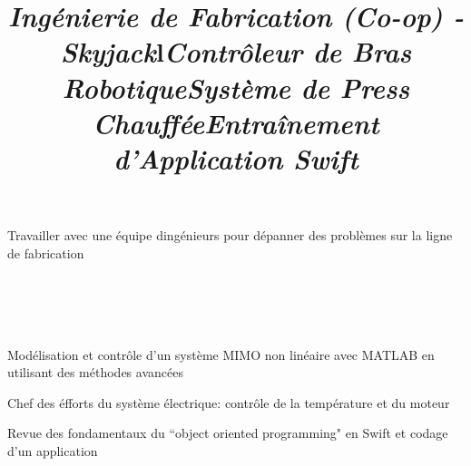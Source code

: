 \documentclass[mm]{res}
\begin{document}
\begin{resume}
\title{\textsl{Ing\'enierie de Fabrication (Co-op) - Skyjack}}
\begin{position}
\tb Travailler avec une \'equipe d\textquotesingle ing\'enieurs pour d\'epanner des probl\`emes sur la ligne de fabrication
\end{position}


\toprule

\section{\headingprojects}
\begin{format}
\title{l}\\
\body\\
\end{format}


\title{\textsl{Contr\^oleur de Bras Robotique}}
\begin{position}
\tb Mod\'elisation et contr\^ole d'un syst\`eme MIMO non lin\'eaire avec MATLAB en utilisant des m\'ethodes avanc\'ees
\end{position}

\title{\textsl{Syst\`eme de Press Chauff\'ee}}
\begin{position}
\tb Chef des \'efforts du syst\`eme \'electrique: contr\^ole de la temp\'erature et du moteur 
\end{position}

\title{\textsl{Entra\^inement d'Application Swift}}
\begin{position}
\tb Revue des fondamentaux du ``object oriented programming" en Swift et codage d'un application
\end{position}


\end{resume}
\end{document}
